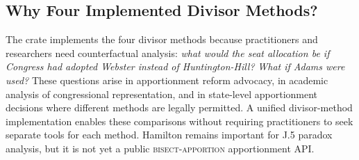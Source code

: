 \subsection{Why Four Implemented Divisor Methods?}

The crate implements the four divisor methods because practitioners and
researchers need counterfactual analysis:
\emph{what would the seat allocation be if Congress had adopted
Webster instead of Huntington-Hill?}
\emph{What if Adams were used?}
These questions arise in apportionment reform advocacy, in academic
analysis of congressional representation, and in state-level
apportionment decisions where different methods are legally permitted.
A unified divisor-method implementation enables these comparisons without
requiring practitioners to seek separate tools for each method.  Hamilton remains
important for J.5 paradox analysis, but it is not yet a public
\textsc{bisect-apportion} apportionment API.
